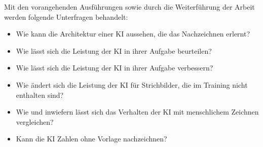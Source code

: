 Mit den vorangehenden Ausführungen sowie durch die Weiterführung der Arbeit
werden folgende Unterfragen behandelt:
\begin{itemize}
   \item Wie kann die Architektur einer KI aussehen, die das Nachzeichnen erlernt?
   \item Wie lässt sich die Leistung der KI in ihrer Aufgabe beurteilen?
   \item Wie lässt sich die Leistung der KI in ihrer Aufgabe verbessern?
   \item Wie ändert sich die Leistung der KI für Strichbilder, die im Training nicht enthalten sind?
   \item Wie und inwiefern lässt sich das Verhalten der KI mit menschlichem Zeichnen vergleichen?
   \item Kann die KI Zahlen ohne Vorlage nachzeichnen?
\end{itemize}

